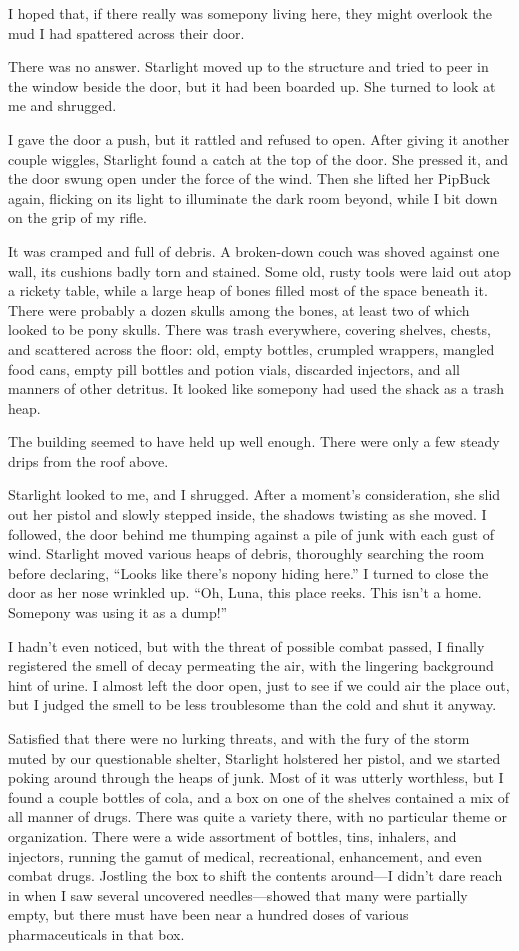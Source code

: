 I hoped that, if there really was somepony living here, they might overlook the mud I had spattered across their door.

There was no answer. Starlight moved up to the structure and tried to peer in the window beside the door, but it had been boarded up. She turned to look at me and shrugged.

I gave the door a push, but it rattled and refused to open. After giving it another couple wiggles, Starlight found a catch at the top of the door. She pressed it, and the door swung open under the force of the wind. Then she lifted her PipBuck again, flicking on its light to illuminate the dark room beyond, while I bit down on the grip of my rifle.

It was cramped and full of debris. A broken-down couch was shoved against one wall, its cushions badly torn and stained. Some old, rusty tools were laid out atop a rickety table, while a large heap of bones filled most of the space beneath it. There were probably a dozen skulls among the bones, at least two of which looked to be pony skulls. There was trash everywhere, covering shelves, chests, and scattered across the floor: old, empty bottles, crumpled wrappers, mangled food cans, empty pill bottles and potion vials, discarded injectors, and all manners of other detritus. It looked like somepony had used the shack as a trash heap.

The building seemed to have held up well enough. There were only a few steady drips from the roof above.

Starlight looked to me, and I shrugged. After a moment’s consideration, she slid out her pistol and slowly stepped inside, the shadows twisting as she moved. I followed, the door behind me thumping against a pile of junk with each gust of wind. Starlight moved various heaps of debris, thoroughly searching the room before declaring, “Looks like there’s nopony hiding here.” I turned to close the door as her nose wrinkled up. “Oh, Luna, this place reeks. This isn’t a home. Somepony was using it as a dump!”

I hadn’t even noticed, but with the threat of possible combat passed, I finally registered the smell of decay permeating the air, with the lingering background hint of urine. I almost left the door open, just to see if we could air the place out, but I judged the smell to be less troublesome than the cold and shut it anyway.

Satisfied that there were no lurking threats, and with the fury of the storm muted by our questionable shelter, Starlight holstered her pistol, and we started poking around through the heaps of junk. Most of it was utterly worthless, but I found a couple bottles of cola, and a box on one of the shelves contained a mix of all manner of drugs. There was quite a variety there, with no particular theme or organization. There were a wide assortment of bottles, tins, inhalers, and injectors, running the gamut of medical, recreational, enhancement, and even combat drugs. Jostling the box to shift the contents around—I didn’t dare reach in when I saw several uncovered needles—showed that many were partially empty, but there must have been near a hundred doses of various pharmaceuticals in that box.

